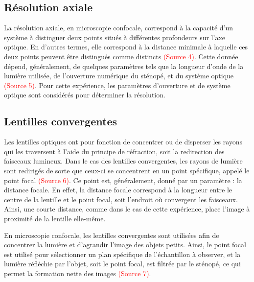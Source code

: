 \documentclass[11pt,letterpaper]{article}
\begin{document}
\subsection{Résolution axiale}
La résolution axiale, en microscopie confocale, correspond à la capacité d'un système à distinguer deux points situés à différentes profondeurs sur l'axe optique. En d'autres termes, elle correspond à la distance minimale à laquelle ces deux points peuvent être distingués comme distincts \textcolor{red}{(Source 4)}. Cette donnée dépend, généralement, de quelques paramètres tels que la longueur d'onde de la lumière utilisée, de l'ouverture numérique du sténopé, et du système optique \textcolor{red}{(Source 5)}. Pour cette expérience, les paramètres d'ouverture et de système optique sont considérés pour déterminer la résolution.



\subsection{Lentilles convergentes}
Les lentilles optiques ont pour fonction de concentrer ou de disperser les rayons qui les traversent à l'aide du principe de réfraction, soit la redirection des faisceaux lumineux. Dans le cas des lentilles convergentes, les rayons de lumière sont redirigés de sorte que ceux-ci se concentrent en un point spécifique, appelé le point focal \textcolor{red}{(Source 6)}. Ce point est, généralement, donné par un paramètre : la distance focale. En effet, la distance focale correspond à la longueur entre le centre de la lentille et le point focal, soit l'endroit où convergent les faisceaux. Ainsi, une courte distance, comme dans le cas de cette expérience, place l'image à proximité de la lentille elle-même.

En microscopie confocale, les lentilles convergentes sont utilisées afin de concentrer la lumière et d'agrandir l'image des objets petits. Ainsi, le point focal est utilisé pour sélectionner un plan spécifique de l'échantillon à observer, et la lumière réfléchie par l'objet, soit le point focal, est filtrée par le sténopé, ce qui permet la formation nette des images \textcolor{red}{(Source 7)}.
\end{document}
